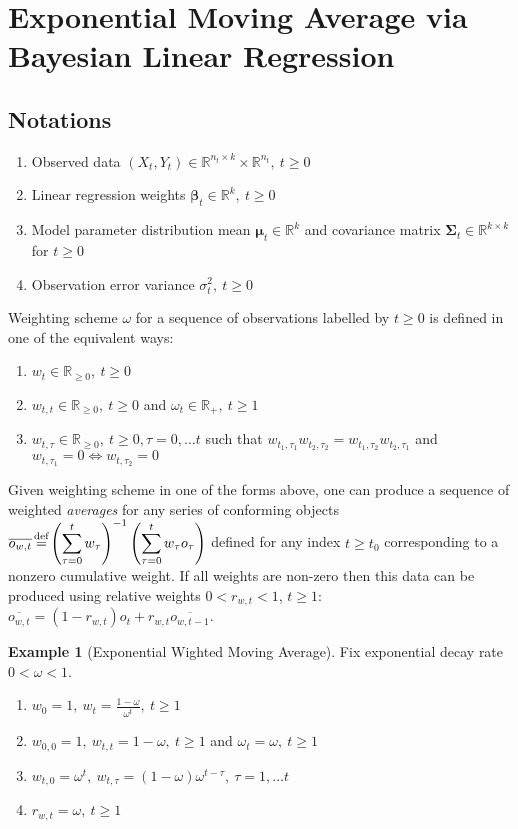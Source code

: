 \documentclass[10pt,fleqn]{amsart}
\theoremstyle{definition}
\newtheorem{example}[theorem]{Example}
\theoremstyle{remark}
\numberwithin{equation}{section}
\newcommand{\RR}{\mathbb{R}}
\newcommand{\eq}{\stackrel{\mathclap{\normalfont\text{def}}}{=}}
\newcommand{\bbeta}{\boldsymbol{\beta}}
\newcommand{\mmu}{\boldsymbol{\mu}}
\newcommand{\SSigma}{\boldsymbol{\Sigma}}
\begin{document}
\section{Exponential Moving Average via Bayesian Linear Regression}
\subsection{Notations}
\begin{enumerate}
    \item Observed data $(X_t, Y_t)\in \RR^{n_t\times k}\times \RR^{n_t},\ t\geq 0$
    \item Linear regression weights $\bbeta_t \in \RR^k,\ t\geq 0$
    \item Model parameter distribution mean $\mmu_t \in \RR^k$ and covariance matrix $\SSigma_t \in \RR^{k\times k}$ for $t\geq 0$
    \item Observation error variance $\sigma_t^2,\ t\geq 0$
\end{enumerate}
Weighting scheme $\omega$ for a sequence of observations labelled by $t\geq 0$ is defined in one of the equivalent ways:
\begin{enumerate}
    \item $w_t\in \RR_{\geq 0},\ t\geq 0$
    \item $w_{t,t}\in \RR_{\geq 0},\ t\geq 0$ and $\omega_t\in \RR_+,\ t\geq 1$
    \item $w_{t,\tau}\in \RR_{\geq 0},\ t\geq 0, \tau=0,\ldots t$ such that $w_{t_1,\tau_1}w_{t_2,\tau_2}=w_{t_1,\tau_2}w_{t_2,\tau_1}$ and $w_{t,\tau_1}=0\Leftrightarrow  w_{t,\tau_2}=0$
\end{enumerate}
Given weighting scheme in one of the forms above, one can produce a sequence of weighted \emph{averages}
for any series of conforming objects
$\displaystyle \overline{o_{w,t}}\eq\left(\sum_{\tau=0}^t w_\tau\right)^{-1}\left(\sum_{\tau=0}^t w_\tau o_\tau\right)$
defined for any index $t\geq t_0$ corresponding to a nonzero cumulative weight.
If all weights are non-zero then this data can be produced using relative weights $0<r_{w,t}<1$, $t\geq 1$:
$\displaystyle \overline{o_{w,t}}=\left(1-r_{w,t}\right)o_t+r_{w,t}\overline{o_{w,t-1}}$.
\begin{example}[Exponential Wighted Moving Average] Fix exponential decay rate $0<\omega<1$.
    \begin{enumerate}
        \item $\displaystyle w_0=1,\ w_t=\frac {1-\omega}{\omega^t},\ t\geq 1$
        \item $\displaystyle w_{0,0}=1,\ w_{t,t}=1-\omega,\ t\geq 1$ and $\omega_t=\omega,\ t\geq 1$
        \item $\displaystyle w_{t,0}=\omega^t,\ w_{t,\tau}=\left(1-\omega\right)\omega^{t-\tau},\ \tau=1,\ldots t$
        \item $r_{w,t}=\omega,\ t\geq 1$
    \end{enumerate}
\end{example}
\end{document}
